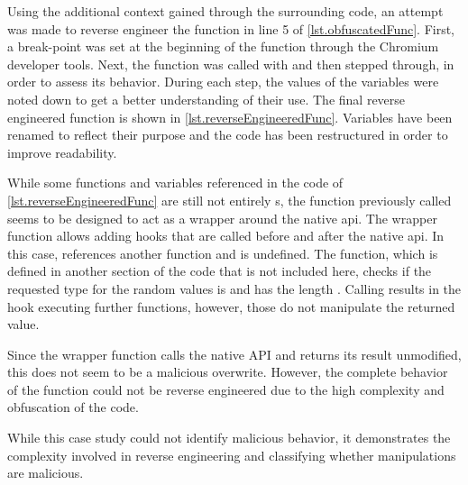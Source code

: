 Using the additional context gained through the surrounding code, an attempt was made to reverse engineer the function  in line 5 of \autoref{lst.obfuscatedFunc}. First, a break-point was set at the beginning of the function through the Chromium developer tools. Next, the function was called with  and then stepped through, in order to assess its behavior. During each step, the values of the variables were noted down to get a better understanding of their use. The final reverse engineered function is shown in \autoref{lst.reverseEngineeredFunc}. Variables have been renamed to reflect their purpose and the code has been restructured in order to improve readability.

While some functions and variables referenced in the code of \autoref{lst.reverseEngineeredFunc} are still not entirely s, the function previously called  seems to be designed to act as a wrapper around the native \ac{api}. The wrapper function allows adding hooks that are called before and after the native \ac{api}. In this case,  references another function and  is undefined. The  function, which is defined in another section of the code that is not included here, checks if the requested type for the random values is  and has the length . Calling  results in the hook executing further functions, however, those do not manipulate the returned value.

\filbreak{}

Since the wrapper function calls the native  API and returns its result unmodified, this does not seem to be a malicious \browserAPI{} overwrite. However, the complete behavior of the function could not be reverse engineered due to the high complexity and obfuscation of the code.

While this case study could not identify malicious behavior, it demonstrates the complexity involved in reverse engineering and classifying whether manipulations are malicious.

\par{}

